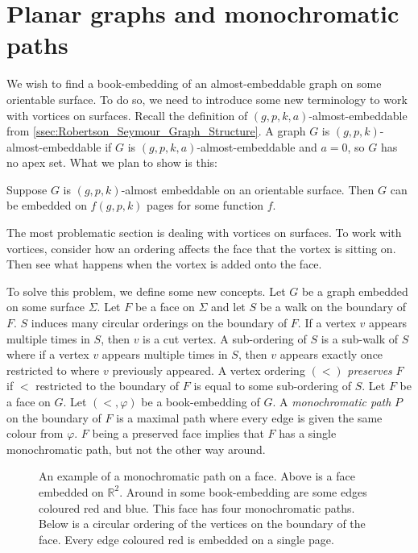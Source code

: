 \section{Planar graphs and monochromatic paths}

We wish to find a book-embedding of an almost-embeddable graph on some orientable surface. To do so, we need to introduce some new terminology to work with vortices on surfaces. 
Recall the definition of $(g, p, k, a)$-almost-embeddable from \cref{ssec:Robertson_Seymour_Graph_Structure}. A graph $G$ is $(g, p, k)$-almost-embeddable if $G$ is $(g, p, k, a)$-almost-embeddable and $a = 0$, so $G$ has no apex set.
What we plan to show is this:
\begin{theorem}\label{thm:bounded_almost_embeddable}
	Suppose $G$ is $(g, p, k)$-almost embeddable on an orientable surface. Then $G$ can be embedded on \(f(g, p, k)\) pages for some function $f$.
\end{theorem}

The most problematic section is dealing with vortices on surfaces.
To work with vortices, consider how an ordering affects the face that the vortex is sitting on. Then see what happens when the vortex is added onto the face. 

To solve this problem, we define some new concepts. Let \(G\) be a graph embedded on some surface $\Sigma$. Let $F$ be a face on $\Sigma$ and let $S$ be a walk on the boundary of $F$. $S$ induces many circular orderings on the boundary of $F$. If a vertex $v$ appears multiple times in $S$, then $v$ is a cut vertex. A sub-ordering of $S$ is a sub-walk of $S$ where if a vertex $v$ appears multiple times in $S$, then $v$ appears exactly once restricted to where $v$ previously appeared. A vertex ordering \((<)\) \textit{preserves} \(F\) if $<$ restricted to the boundary of $F$ is equal to some sub-ordering of $S$.
Let \(F\) be a face on \(G\). Let \( (<, \varphi) \) be a book-embedding of \(G\). A \textit{monochromatic path} $P$ on the boundary of $F$ is a maximal path where every edge is given the same colour from $\varphi$. $F$ being a preserved face implies that $F$ has a single monochromatic path, but not the other way around. 

\begin{figure}[h!]
	\centering
	
	\caption[Monochromatic paths]{An example of a monochromatic path on a face. Above is a face embedded on $\mathbb{R}^2$. Around in some book-embedding are some edges coloured red and blue. This face has four monochromatic paths. Below is a circular ordering of the vertices on the boundary of the face. Every edge coloured red is embedded on a single page.}
\end{figure}


